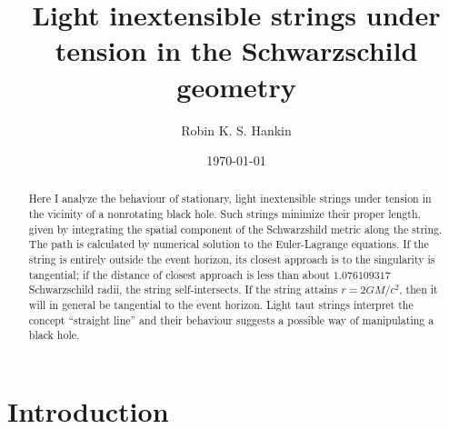\documentclass[prb,preprint]{revtex4-1}
\begin{document}

\title{Light inextensible strings under tension in the Schwarzschild geometry}

\author{Robin K. S. Hankin}



\date{\today}

\begin{abstract}
Here I analyze the behaviour of stationary, light inextensible strings
under tension in the vicinity of a nonrotating black hole.  Such
strings minimize their proper length, given by integrating the spatial
component of the Schwarzshild metric along the string.  The path is
calculated by numerical solution to the Euler-Lagrange equations.  If
the string is entirely outside the event horizon, its closest approach
is to the singularity is tangential; if the distance of closest
approach is less than about $1.076109317$ Schwarzschild radii, the
string self-intersects.  If the string attains $r=2GM/c^2$, then it
will in general be tangential to the event horizon.  Light taut
strings interpret the concept ``straight line'' and their behaviour
suggests a possible way of manipulating a black hole.
\end{abstract}

\maketitle %


\section{Introduction} %
\end{document}
